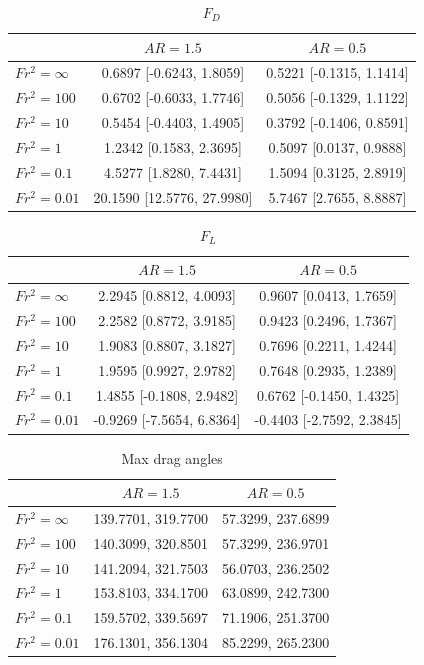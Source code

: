 \begin{table}
\centering
\begin{tabular}{lcc}
                 & $AR = 1.5$                 & $AR = 0.5$                \\ \hline
 $Fr^2 = \infty$ & 0.6897 [-0.6243, 1.8059]   & 0.5221 [-0.1315, 1.1414]  \\
 $Fr^2 = 100$    & 0.6702 [-0.6033, 1.7746]   & 0.5056 [-0.1329, 1.1122]  \\
 $Fr^2 = 10$     & 0.5454 [-0.4403, 1.4905]   & 0.3792 [-0.1406, 0.8591]  \\
 $Fr^2 = 1$      & 1.2342 [0.1583, 2.3695]    & 0.5097 [0.0137, 0.9888]   \\
 $Fr^2 = 0.1$    & 4.5277 [1.8280, 7.4431]    & 1.5094 [0.3125, 2.8919]   \\
 $Fr^2 = 0.01$   & 20.1590 [12.5776, 27.9980] & 5.7467 [2.7655, 8.8887]              
\end{tabular}
\caption{$F_D$}
\label{tab:fd}
\end{table}

\begin{table}
\centering
\begin{tabular}{lcc}
                 & $AR = 1.5$                 & $AR = 0.5$                 \\ \hline
 $Fr^2 = \infty$ & 2.2945 [0.8812, 4.0093]    &  0.9607 [0.0413, 1.7659]   \\
 $Fr^2 = 100$    & 2.2582 [0.8772, 3.9185]    &  0.9423 [0.2496, 1.7367]   \\
 $Fr^2 = 10$     & 1.9083 [0.8807, 3.1827]    &  0.7696 [0.2211, 1.4244]   \\
 $Fr^2 = 1$      & 1.9595 [0.9927, 2.9782]    &  0.7648 [0.2935, 1.2389]   \\
 $Fr^2 = 0.1$    & 1.4855 [-0.1808, 2.9482]   &  0.6762 [-0.1450, 1.4325]  \\
 $Fr^2 = 0.01$   & -0.9269 [-7.5654, 6.8364]  & -0.4403 [-2.7592, 2.3845]              
\end{tabular}
\caption{$F_L$}
\label{tab:fl}
\end{table}


\begin{table}
\centering
\begin{tabular}{lcc}
                 & $AR = 1.5$          & $AR = 0.5$         \\ \hline
 $Fr^2 = \infty$ & 139.7701, 319.7700  & 57.3299, 237.6899  \\
 $Fr^2 = 100$    & 140.3099, 320.8501  & 57.3299, 236.9701  \\
 $Fr^2 = 10$     & 141.2094, 321.7503  & 56.0703, 236.2502  \\
 $Fr^2 = 1$      & 153.8103, 334.1700  & 63.0899, 242.7300  \\
 $Fr^2 = 0.1$    & 159.5702, 339.5697  & 71.1906, 251.3700  \\
 $Fr^2 = 0.01$   & 176.1301, 356.1304  & 85.2299, 265.2300             
\end{tabular}
\caption{Max drag angles}
\label{tab:max_drag}
\end{table}

